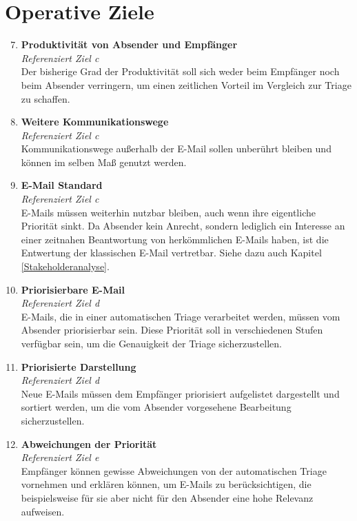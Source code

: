 \section{Operative Ziele}
\label{Operative_Ziele}
\begin{enumerate}[label=(\alph*)]
\setcounter{enumi}{6}
    \item \textbf{Produktivität von Absender und Empfänger}\\
    \textit{Referenziert Ziel c} \\
        Der bisherige Grad der Produktivität soll sich weder beim Empfänger noch beim Absender verringern, um einen zeitlichen Vorteil im Vergleich zur Triage zu schaffen. 
        
    \item \textbf{Weitere Kommunikationswege}\\
    \textit{Referenziert Ziel c} \\
        Kommunikationswege außerhalb der E-Mail sollen unberührt bleiben und können im selben Maß genutzt werden. 
        
    \item \textbf{E-Mail Standard}\\
    \textit{Referenziert Ziel c} \\
        E-Mails müssen weiterhin nutzbar bleiben, auch wenn ihre eigentliche Priorität sinkt. Da Absender kein Anrecht, sondern lediglich ein Interesse an einer zeitnahen Beantwortung von herkömmlichen E-Mails haben, ist die Entwertung der klassischen E-Mail vertretbar. Siehe dazu auch Kapitel \ref{Stakeholderanalyse}.
    
    \item \textbf{Priorisierbare E-Mail}\\
    \textit{Referenziert Ziel d} \\
        E-Mails, die in einer automatischen Triage verarbeitet werden, müssen vom Absender priorisierbar sein. Diese Priorität soll in verschiedenen Stufen verfügbar sein, um die Genauigkeit der Triage sicherzustellen.
         
    \item \textbf{Priorisierte Darstellung}\\
    \textit{Referenziert Ziel d} \\
        Neue E-Mails müssen dem Empfänger priorisiert aufgelistet dargestellt und sortiert werden, um die vom Absender vorgesehene Bearbeitung sicherzustellen. 
        
    \item \textbf{Abweichungen der Priorität}\\
    \textit{Referenziert Ziel e} \\
        Empfänger können gewisse Abweichungen von der automatischen Triage vornehmen und erklären können, um E-Mails zu berücksichtigen, die beispielsweise für sie aber nicht für den Absender eine hohe Relevanz aufweisen.
        

\end{enumerate}
